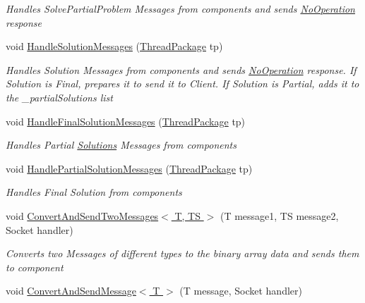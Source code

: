 \begin{DoxyCompactItemize}
\begin{DoxyCompactList}\small\item\em Handles Solve\+Partial\+Problem Messages from components and sends \hyperlink{class_no_operation}{No\+Operation} response \end{DoxyCompactList}\item 
void \hyperlink{class_communication_server_1_1_message_dispatcher_a8f18f2d10e25186d1880c1d3bc2f2310}{Handle\+Solution\+Messages} (\hyperlink{class_communication_server_1_1_thread_package}{Thread\+Package} tp)
\begin{DoxyCompactList}\small\item\em Handles Solution Messages from components and sends \hyperlink{class_no_operation}{No\+Operation} response. If Solution is Final, prepares it to send it to Client. If Solution is Partial, adds it to the \+\_\+partial\+Solutions list \end{DoxyCompactList}\item 
void \hyperlink{class_communication_server_1_1_message_dispatcher_a0a7ba1a0e7cc4ad3cad9c8667783b3a1}{Handle\+Final\+Solution\+Messages} (\hyperlink{class_communication_server_1_1_thread_package}{Thread\+Package} tp)
\begin{DoxyCompactList}\small\item\em Handles Partial \hyperlink{class_solutions}{Solutions} Messages from components \end{DoxyCompactList}\item 
void \hyperlink{class_communication_server_1_1_message_dispatcher_a89db15326a47cc13771a5108640cc231}{Handle\+Partial\+Solution\+Messages} (\hyperlink{class_communication_server_1_1_thread_package}{Thread\+Package} tp)
\begin{DoxyCompactList}\small\item\em Handles Final Solution from components \end{DoxyCompactList}\item 
void \hyperlink{class_communication_server_1_1_message_dispatcher_afe7a90c6cf0a72550a2187f6c8e14f63}{Convert\+And\+Send\+Two\+Messages$<$ T, T\+S $>$} (T message1, T\+S message2, Socket handler)
\begin{DoxyCompactList}\small\item\em Converts two Messages of different types to the binary array data and sends them to component \end{DoxyCompactList}\item 
void \hyperlink{class_communication_server_1_1_message_dispatcher_afbb0bdc3da4c4f28575bea83dbbdfdcd}{Convert\+And\+Send\+Message$<$ T $>$} (T message, Socket handler)

\end{DoxyCompactItemize}
